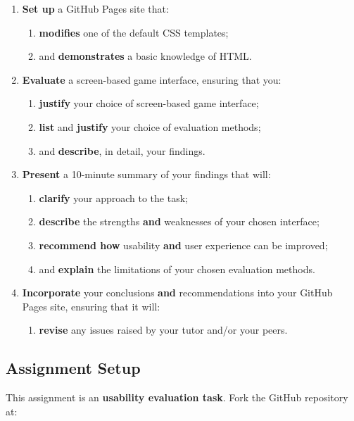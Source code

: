 \documentclass{../fal_assignment}
\begin{document}
\begin{enumerate}[label=(\alph*)]
    \item \textbf{Set up} a GitHub Pages site that:
    	\begin{enumerate}[label=\roman*.]
    		\item \textbf{modifies} one of the default CSS templates;
    		\item and \textbf{demonstrates} a basic knowledge of HTML.
	\end{enumerate}
    \item \textbf{Evaluate} a screen-based game interface, ensuring that you:
    	\begin{enumerate}[label=\roman*.]
    		\item \textbf{justify} your choice of screen-based game interface;
    		\item \textbf{list} and \textbf{justify} your choice of evaluation methods;
		\item and \textbf{describe}, in detail, your findings.
	\end{enumerate}
    \item \textbf{Present} a 10-minute summary of your findings that will:
    	\begin{enumerate}[label=\roman*.]
    		\item \textbf{clarify} your approach to the task;
    		\item \textbf{describe} the strengths \textbf{and} weaknesses of your chosen interface;
    		\item \textbf{recommend how} usability \textbf{and} user experience can be improved;
    		\item and \textbf{explain} the limitations of your chosen evaluation methods.
	\end{enumerate}
	\item \textbf{Incorporate} your conclusions \textbf{and} recommendations into your GitHub Pages site, ensuring that it will:
    	\begin{enumerate}[label=\roman*.]
    		\item \textbf{revise} any issues raised by your tutor and/or your peers.		
	\end{enumerate}
\end{enumerate}

\subsection*{Assignment Setup}

This assignment is an \textbf{usability evaluation task}. Fork the GitHub repository at:
\end{document}
